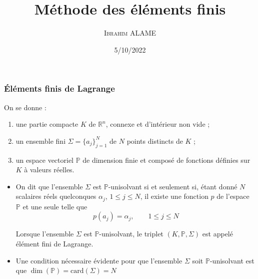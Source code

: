 \documentclass{beamer}
\title{Méthode des éléments finis}
\author{ \textsc{Ibrahim ALAME}}\institute{ESTP}
\date{5/10/2022}
\begin{document}
 \begin{frame}
  \titlepage
  \end{frame}
  
\begin{frame}
\frametitle{Éléments finis de Lagrange}
  On se donne :
  \begin{enumerate}
  \item une partie compacte $K$ de $\mathbb{R}^n$, connexe et d'intérieur non vide ; 
  \item un ensemble fini $\Sigma =\{a_j\}_{j=1}^N$ de $N$ points distincts de $K$ ;
  \item un espace vectoriel $\mathbb{P}$ de dimension finie et composé de fonctions définies 
sur $K$ à valeurs réelles.
  \end{enumerate}  
  \begin{itemize}
\item On dit que l'ensemble $\Sigma$ est $\mathbb{P}$-unisolvant si et seulement si, étant donné $N$ scalaires réels quelconques $\alpha_j$, $1\leq j \leq N$, il existe une fonction $p$ de l'espace $\mathbb{P}$ et une seule telle que
                          \begin{equation}
                          p(a_j)=\alpha_j,\qquad 1\leq j \leq N
                          \end{equation}

Lorsque l'ensemble $\Sigma$ est $\mathbb{P}$-unisolvant, le triplet $(K, \mathbb{P}, \Sigma)$ est appelé élément fini de Lagrange.
\item Une condition nécessaire évidente pour que l'ensemble $\Sigma$ soit 
$\mathbb{P}$-unisolvant est que $\dim(\mathbb{P})=\mbox{card}(\Sigma)=N$
  \end{itemize}
\end{frame}
\end{document}
